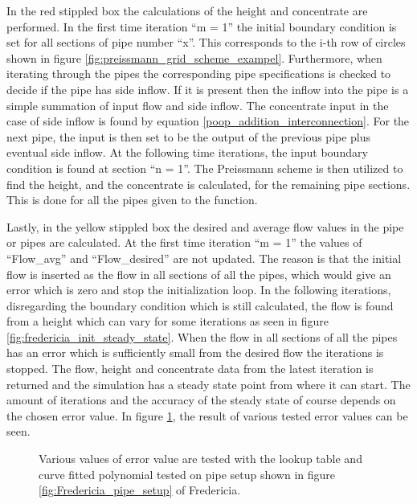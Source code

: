 In the red stippled box the calculations of the height and concentrate are performed. In the first time iteration ``m = 1'' the initial boundary condition is set for all sections of pipe number ``x''. This corresponds to the i-th row of circles shown in figure \ref{fig:preissmann_grid_scheme_exampel}. Furthermore, when iterating through the pipes the corresponding pipe specifications is checked to decide if the pipe has side inflow. If it is present then the inflow into the pipe is a simple summation of input flow and side inflow. The concentrate input in the case of side inflow is found by equation \ref{poop_addition_interconnection}. For the next pipe, the input is then set to be the output of the previous pipe plus eventual side inflow. At the following time iterations, the input boundary condition is found at section ``n = 1''. The Preissmann scheme is then utilized to find the height, and the concentrate is calculated, for the remaining pipe sections. This is done for all the pipes given to the function.

Lastly, in the yellow stippled box the desired and average flow values in the pipe or pipes are calculated. At the first time iteration ``m = 1'' the values of ``Flow\_avg'' and ``Flow\_desired'' are not updated. The reason is that the initial flow is inserted as the flow in all sections of all the pipes, which would give an error which is zero and stop the initialization loop. In the following iterations, disregarding the boundary condition which is still calculated, the flow is found from a height which can vary for some iterations as seen in figure \ref{fig:fredericia_init_steady_state}. When the flow in all sections of all the pipes has an error which is sufficiently small from the desired flow the iterations is stopped. The flow, height and concentrate data from the latest iteration is returned and the simulation has a steady state point from where it can start. The amount of iterations and the accuracy of the steady state of course depends on the chosen error value. In figure \ref{fig:error_value_test}, the result of various tested error values can be seen.

\begin{figure}[H]
 \centering
 
\caption{Various values of error value are tested with the lookup table and curve fitted polynomial tested on pipe setup shown in figure \ref{fig:Fredericia_pipe_setup} of Fredericia.}
\label{fig:error_value_test}
\end{figure} 

